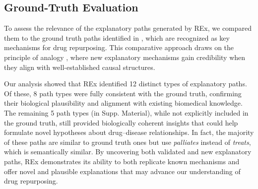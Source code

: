 \documentclass{article}
\theoremstyle{definition}
\begin{document}
\begin{table}[h!]
\centering
\caption{Performance comparison for different types of IC on REx using Hetionet based on hits@k and MRR.}
\label{tab:results_ic}
\end{table}

\subsection{Ground-Truth Evaluation}
To assess the relevance of the explanatory paths generated by REx, we compared them to the ground truth paths identified in \cite{himmelstein2017systematic}, which are recognized as key mechanisms for drug repurposing. This comparative approach draws on the principle of analogy \cite{thagard1978best,thagard1989explanatory}, where new explanatory mechanisms gain credibility when they align with well-established causal structures. 

Our analysis showed that REx identified 12 distinct types of explanatory paths. Of these, 8 path types were fully consistent with the ground truth, confirming their biological plausibility and alignment with existing biomedical knowledge. The remaining 5 path types (in Supp. Material), while not explicitly included in the ground truth, still provided biologically coherent insights that could help formulate novel hypotheses about drug–disease relationships. In fact, the majority of these paths are similar to ground truth ones but use \textit{palliates} instead of \textit{treats}, which is semantically similar. By uncovering both validated and new explanatory paths, REx demonstrates its ability to both replicate known mechanisms and offer novel and plausible explanations that may advance our understanding of drug repurposing. 
\end{document}

